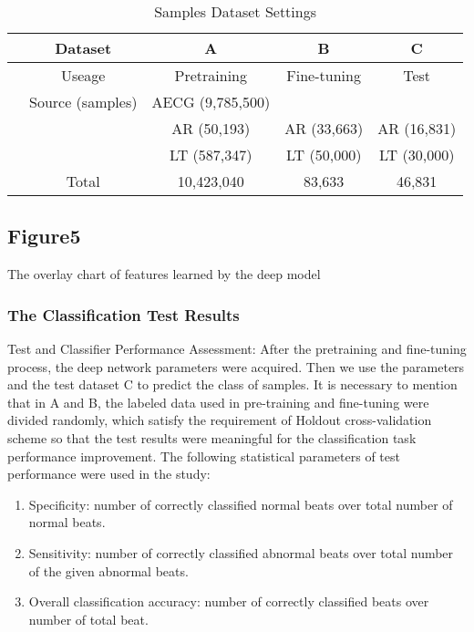 \documentclass{bmcart}
\begin{document}
     
\begin{table}[!htbp]
\begin{center}
\begin{threeparttable}
\caption{Samples Dataset Settings}
\label{table3}
\begin{tabular}{ccccc}
\hline
& Dataset & A & B  &  C\\
\hline
& Useage  & Pretraining & Fine-tuning & Test \\
\hline
& Source (samples) & AECG (9,785,500)   &  &   \\
&  & AR (50,193)   & AR (33,663) & AR (16,831) \\
&  & LT (587,347)  & LT (50,000) & LT (30,000) \\
\hline
&Total & 10,423,040 & 83,633 & 46,831 \\
\hline
\end{tabular}
\end{threeparttable}
\end{center}
\end{table}



\subsection*{Figure5}

The overlay chart of features learned by the deep model

 
 







\subsubsection*{The Classification Test Results}
Test and Classifier Performance Assessment: After the pretraining and fine-tuning process, the deep network parameters were acquired. Then we use the parameters and the test dataset C to predict the class of samples. It is necessary to mention that in A and B, the labeled data used in pre-training and fine-tuning were divided randomly, which satisfy the requirement of Holdout cross-validation scheme so that the test results were meaningful for the classification task performance improvement.
The following statistical parameters of test performance were used in the study:
\begin{enumerate}
\item Specificity: number of correctly classified normal beats over total number of normal beats.
\item Sensitivity: number of correctly classified abnormal beats over total number of the given abnormal beats.
\item Overall classification accuracy: number of correctly classified beats over number of total beat.
\end{enumerate}
\end{document}
